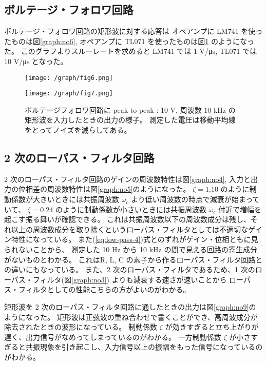 \documentclass[11pt,dvipdfmx,a4paper]{jsarticle}
\begin{document}
\subsection{ボルテージ・フォロワ回路}
ボルテージ・フォロワ回路の矩形波に対する応答は
オペアンプに LM741 を使ったものは図\ref{graph:no6},
オペアンプに TL071 を使ったものは図\ref{graph:no7} のようになった。
このグラフよりスルーレートを求めると
LM741 では 1 V/\si{\micro s},
TL071 では 10 V/\si{\micro s} となった。
\begin{figure}[H]
	\centering
	\begin{minipage}[t]{0.49\columnwidth}
		\centering
		\texttt{[image: /graph/fig6.png]}
		\label{graph:no6}
	\end{minipage}
	\hfill
	\begin{minipage}[t]{0.49\columnwidth}
		\centering
		\texttt{[image: /graph/fig7.png]}
		\label{graph:no7}
	\end{minipage}
	\caption{ボルテージフォロワ回路に peak to peak : 10 V, 周波数 10 kHz の矩形波を入力したときの出力の様子。
	測定した電圧は移動平均線をとってノイズを減らしてある。}
\end{figure}

\subsection{2 次のローパス・フィルタ回路}
2 次のローパス・フィルタ回路のゲインの周波数特性は図\ref{graph:no4},
入力と出力の位相差の周波数特性は図\ref{graph:no5}のようになった。
\(\zeta = 1.10\) のように制動係数が大きいときには共振周波数 \(\omega_c\) より低い周波数の時点で減衰が始まっていて、
\(\zeta = 0.24\) のように制動係数が小さいときには共振周波数 \(\omega_c\) 付近で増幅を起こす振る舞いが確認できる。
これは共振周波数以下の周波数成分は残し、それ以上の周波数成分を取り除くというローパス・フィルタとしては不適切なゲイン特性になっている。
また(\ref{eq:low-pass-4})式とのずれがゲイン・位相ともに見られないことから、
測定した 10 Hz から 10 kHz の間で見える回路の寄生成分がないものとわかる。
これはR, L, C の素子から作るローパス・フィルタ回路との違いにもなっている。
また、2 次のローパス・フィルタであるため、1 次のローパス・フィルタ(図\ref{graph:no3}) よりも減衰する速さが速いことから
ローパス・フィルタとしての性能こちらの方がよいのがわかる。

矩形波を 2 次のローパス・フィルタ回路に通したときの出力は図\ref{graph:no9}のようになった。
矩形波は正弦波の重ね合わせで書くことができ、高周波成分が除去されたときの波形になっている。
制動係数 \(\zeta\) が効きすぎると立ち上がりが遅く、出力信号がなめってしまっているのがわかる。
一方制動係数 \(\zeta\) が小さすぎると共振現象を引き起こし、入力信号以上の振幅をもった信号になっているのがわかる。
\end{document}
